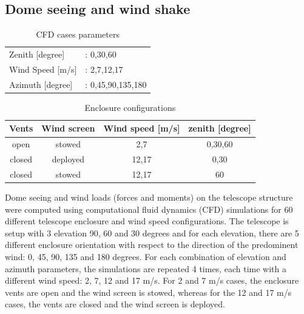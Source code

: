 \documentclass{gmto}
\begin{document}
\subsection{Dome seeing and wind shake}
\label{sec:CFD}

\begin{table}
  \centering
  \begin{tabular}{ll}\\
    Zenith [degree] & : 0,30,60 \\
    Wind Speed [m/s] & : 2,7,12,17 \\
    Azimuth [degree] & : 0,45,90,135,180
  \end{tabular}
  \caption{CFD cases parameters}
  \label{tab:1}
\end{table}
\begin{table}
  \centering
  \begin{tabular}{cc@{  (}cc@{)}}
    Vents & Wind screen & Wind speed [m/s] & zenith [degree] \\\hline
    open & stowed & 2,7 & 0,30,60 \\
    closed & deployed & 12,17 & 0,30\\
    closed & stowed & 12,17 & 60 
  \end{tabular}
  \caption{Enclosure configurations}
  \label{tab:2}
\end{table}

Dome seeing and wind loads (forces and moments) on the telescope structure were computed using computational fluid dynamics (CFD) simulations for 60 different telescope enclosure and wind speed configurations.
The telescope is setup with 3 elevation 90, 60 and 30 degrees and for each elevation, there are 5 different enclosure orientation with respect to the direction of the predominent wind: 0, 45, 90, 135 and 180 degrees.
For each combination of elevation and azimuth parameters, the simulations are repeated 4 times, each time with a different wind speed: 2, 7, 12 and 17 m/s.
For 2 and 7 m/s cases, the enclosure vents are open and the wind screen is stowed, whereas for the 12 and 17 m/s cases, the vents are closed and the wind screen is deployed.
\end{document}
